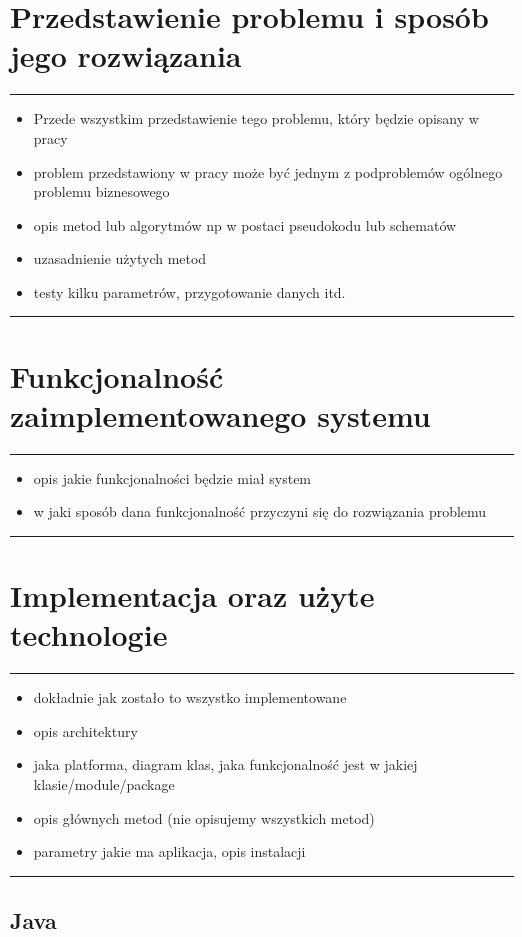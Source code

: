 \documentclass[licencjacka]{pracadypl}
\theoremstyle{definition}
\newcommand{\linia}{\rule{\linewidth}{0.4mm}}
\begin{document}
\chapter{Przedstawienie problemu i sposób jego rozwiązania}
\linia
\begin{itemize}
	\item Przede wszystkim przedstawienie tego problemu, który będzie opisany w pracy
	\item problem przedstawiony w pracy może być jednym z podproblemów ogólnego problemu biznesowego
	\item opis metod lub algorytmów np w postaci pseudokodu lub schematów 
	\item uzasadnienie użytych metod
	\item testy kilku parametrów, przygotowanie danych itd.
\end{itemize}

\linia

\chapter{Funkcjonalność zaimplementowanego systemu}
\linia
\begin{itemize}
	\item opis jakie funkcjonalności będzie miał system
	\item w jaki sposób dana funkcjonalność przyczyni się do rozwiązania problemu
\end{itemize}

\linia

\chapter{Implementacja oraz użyte technologie}
\linia
\begin{itemize}
	\item dokładnie jak zostało to wszystko implementowane
	\item opis architektury
	\item jaka platforma, diagram klas, jaka funkcjonalność jest w jakiej klasie/module/package
	\item opis głównych metod (nie opisujemy wszystkich metod)
	\item parametry jakie ma aplikacja, opis instalacji
\end{itemize}

\linia
\section{Java}
\end{document}
